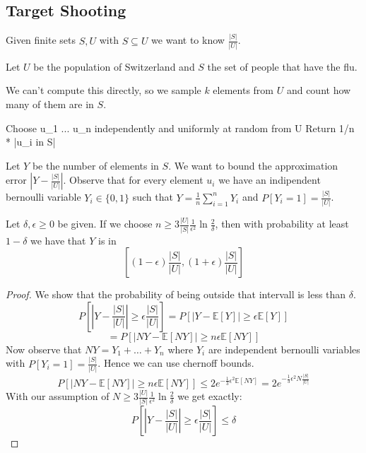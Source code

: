 \subsection{Target Shooting}

Given finite sets $S, U$ with $S \subseteq U$ we want to know $\frac{|S|}{|U|}$.
\begin{example}
    Let $U$ be the population of Switzerland and $S$ the set of people that have the flu.
\end{example}

We can't compute this directly, so we sample $k$ elements from $U$ and count how many of them are in $S$.

\begin{algorithm}
Choose u_1 ... u_n independently and uniformly at random from U
Return 1/n * |{u_i in S}| 
\end{algorithm}

Let $Y$ be the number of elements in $S$. We want to bound the approximation error $|Y - \frac{|S|}{|U|}|$. Observe that for every element $u_i$ we have an indipendent bernoulli variable $Y_i \in \{0,1\}$ such that $Y = \frac{1}{n} \sum_{i=1}^n Y_i$ and $P[Y_i=1] = \frac{|S|}{|U|}$.

\begin{theorem}
    Let $\delta, \epsilon \ge 0$ be given. If we choose $n \geq 3 \frac{|U|}{|S|} \frac{1}{\epsilon^2} \ln \frac{2}{\delta}$, then with probability at least $1-\delta$ we have that $Y$ is in 
    $$[(1-\epsilon)\frac{|S|}{|U|}, (1+\epsilon)\frac{|S|}{|U|}]$$
\end{theorem}

\begin{proof}
    We show that the probability of being outside that intervall is less than $\delta$.
    $$P\left[\left|Y - \frac{|S|}{|U|}\right| \geq \epsilon \frac{|S|}{|U|}\right] = P\left[\left|Y - \mathbb{E}[Y]\right| \geq \epsilon \mathbb{E}[Y]\right]$$
    $$ = P[|NY - \mathbb{E}[NY]| \geq n \epsilon \mathbb{E}[NY]]$$
    Now observe that $NY = Y_1 + \dots + Y_n$ where $Y_i$ are independent bernoulli variables with $P[Y_i=1] = \frac{|S|}{|U|}$. Hence we can use chernoff bounds.
    $$P[|NY - \mathbb{E}[NY]| \geq n \epsilon \mathbb{E}[NY]] \leq 2 e^{-\frac{1}{3} \epsilon^2 \mathbb{E}[NY]} =  2 e^{-\frac{1}{3} \epsilon^2 N \frac{|S|}{|U|}}$$
    With our assumption of $N \geq 3 \frac{|U|}{|S|} \frac{1}{\epsilon^2} \ln \frac{2}{\delta}$ we get exactly:
    $$P\left[\left|Y - \frac{|S|}{|U|}\right| \geq \epsilon \frac{|S|}{|U|}\right] \leq \delta$$
\end{proof}